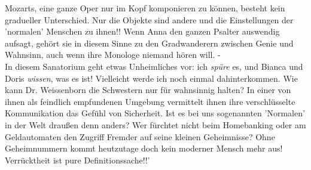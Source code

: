 Mozarts, eine ganze Oper nur im Kopf komponieren zu k\"onnen, besteht kein
gradueller Unterschied. Nur die Objekte sind andere und die Einstellungen der
'normalen' Menschen zu ihnen!! Wenn Anna den ganzen Psalter auswendig aufsagt,
geh\"ort sie in diesem Sinne zu den Gradwanderern zwischen Genie und
Wahnsinn, auch wenn ihre Monologe niemand h\"oren will. - \\
In diesem Sanatorium geht etwas Unheimliches vor: ich {\em sp\"ure\/} es, und
Bianca und Doris {\em wissen\/}, was es ist! Vielleicht werde ich noch einmal
dahinterkommen. Wie kann Dr. Weissenborn die Schwestern nur f\"ur wahnsinnig
halten? In einer von ihnen als feindlich empfundenen Umgebung vermittelt
ihnen ihre verschl\"usselte Kommunikation das Gef\"uhl von Sicherheit. Ist es
bei uns sogenannten 'Normalen' in der Welt drau{\ss}en denn anders? Wer
f\"urchtet nicht beim Homebanking oder am Geldautomaten den Zugriff Fremder
auf seine kleinen Geheimnisse? Ohne Geheimnummern kommt heutzutage doch kein
moderner Mensch mehr aus! Verr\"ucktheit ist pure Definitionssache!!' 